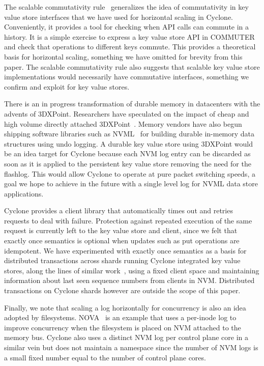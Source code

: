 \documentclass[10pt, preprint, nonatbib]{sigplanconf}
\begin{document}
The scalable commutativity rule~\cite{scalable_commutativity} generalizes the
idea of commutativity in key value store interfaces that we have used for
horizontal scaling in Cyclone. Conveniently, it provides a tool for checking when
API calls can commute in a history. It is a simple exercise to express a key
value store API in COMMUTER and check that operations to different keys
commute. This provides a theoretical basis for horizontal scaling, something we
have omitted for brevity from this paper. The scalable commutativity rule also
suggests that scalable key value store implementations would necessarily have
commutative interfaces, something we confirm and exploit for key
value stores.

There is an in progress transformation of durable memory in datacenters
with the advents of 3DXPoint. Researchers have speculated on the impact of cheap
and high volume directly attached 3DXPoint~\cite{tiering}. Memory vendors have
also begun shipping software libraries such as NVML~\cite{nvml} for building durable
in-memory data structures using undo logging. A durable key value store using
3DXPoint would be an idea target for Cyclone because each NVM log entry can be
discarded as soon as it is applied to the persistent key value store removing
the need for the flashlog. This would allow Cyclone to operate at pure packet
switching speeds, a goal we hope to achieve in the future with a single level
log for NVML data store applications.

Cyclone provides a client library that automatically times out and retries
requests to deal with failure. Protection against repeated execution of the same
request is currently left to the key value store and client, since we felt that
exactly once semantics is optional when updates such as put operations are
idempotent. We have experimented with exactly once semantics as a basis for
distributed transactions across shards running Cyclone integrated key value
stores, along the lines of similar work~\cite{raft_lin}, using a fixed client
space and maintaining information about last seen sequence numbers from clients
in NVM. Distributed transactions on Cyclone shards however are outside the scope
of this paper.

Finally, we note that scaling a log horizontally for concurrency is also an idea
adopted by filesystems. NOVA~\cite{nova} is an example that uses a per-inode log
to improve concurrency when the filesystem is placed on NVM attached to the
memory bus. Cyclone also uses a distinct NVM log per control plane core in a
similar vein but does not maintain a namespace since the number of NVM logs is a
small fixed number equal to the number of control plane cores.
\end{document}
